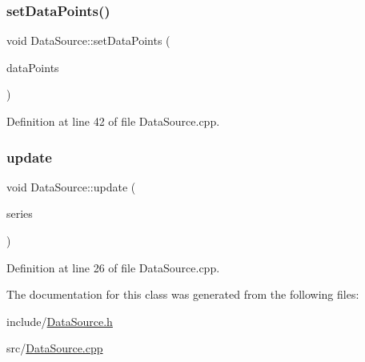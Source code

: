 \subsubsection{\texorpdfstring{set\+Data\+Points()}{setDataPoints()}}
{\footnotesize\ttfamily void Data\+Source\+::set\+Data\+Points (\begin{DoxyParamCaption}\item[{Q\+Vector$<$ double $>$}]{data\+Points }\end{DoxyParamCaption})}



Definition at line 42 of file Data\+Source.\+cpp.

\mbox{\label{class_data_source_a89f6b91336e0beb7958a8f41c24417e2}} 
\subsubsection{\texorpdfstring{update}{update}}
{\footnotesize\ttfamily void Data\+Source\+::update (\begin{DoxyParamCaption}\item[{Q\+Abstract\+Series $\ast$}]{series }\end{DoxyParamCaption})\hspace{0.3cm}{\ttfamily [slot]}}



Definition at line 26 of file Data\+Source.\+cpp.



The documentation for this class was generated from the following files\+:\begin{DoxyCompactItemize}
\item 
include/\hyperlink{_data_source_8h}{Data\+Source.\+h}\item 
src/\hyperlink{_data_source_8cpp}{Data\+Source.\+cpp}\end{DoxyCompactItemize}
